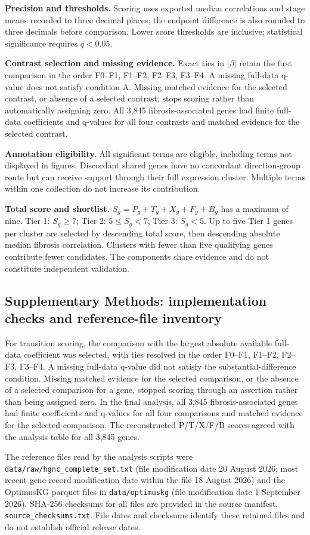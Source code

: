 \documentclass[11pt,a4paper]{article}
\begin{document}
\small
\textbf{Precision and thresholds.} Scoring uses exported median correlations and stage means recorded to three decimal places; the endpoint difference is also rounded to three decimals before comparison. Lower score thresholds are inclusive; statistical significance requires $q<0.05$.

\textbf{Contrast selection and missing evidence.} Exact ties in $|\beta|$ retain the first comparison in the order F0--F1, F1--F2, F2--F3, F3--F4. A missing full-data q-value does not satisfy condition A. Missing matched evidence for the selected contrast, or absence of a selected contrast, stops scoring rather than automatically assigning zero. All 3,845 fibrosis-associated genes had finite full-data coefficients and q-values for all four contrasts and matched evidence for the selected contrast.

\textbf{Annotation eligibility.} All significant terms are eligible, including terms not displayed in figures. Discordant shared genes have no concordant direction-group route but can receive support through their full expression cluster. Multiple terms within one collection do not increase its contribution.

\textbf{Total score and shortlist.} $S_g=P_g+T_g+X_g+F_g+B_g$ has a maximum of nine. Tier 1: $S_g\geq7$; Tier 2: $5\leq S_g<7$; Tier 3: $S_g<5$. Up to five Tier 1 genes per cluster are selected by descending total score, then descending absolute median fibrosis correlation. Clusters with fewer than five qualifying genes contribute fewer candidates. The components share evidence and do not constitute independent validation.
\endgroup

\subsection*{Supplementary Methods: implementation checks and reference-file inventory}
For transition scoring, the comparison with the largest absolute available full-data coefficient was selected, with ties resolved in the order F0--F1, F1--F2, F2--F3, F3--F4. A missing full-data q-value did not satisfy the substantial-difference condition. Missing matched evidence for the selected comparison, or the absence of a selected comparison for a gene, stopped scoring through an assertion rather than being assigned zero. In the final analysis, all 3,845 fibrosis-associated genes had finite coefficients and q-values for all four comparisons and matched evidence for the selected comparison. The reconstructed P/T/X/F/B scores agreed with the analysis table for all 3,845 genes.

The reference files read by the analysis scripts were \nolinkurl{data/raw/hgnc_complete_set.txt} (file modification date 20 August 2026; most recent gene-record modification date within the file 18 August 2026) and the OptimusKG parquet files in \nolinkurl{data/optimuskg} (file modification date 1 September 2026). SHA-256 checksums for all files are provided in the source manifest, \nolinkurl{source_checksums.txt}. File dates and checksums identify these retained files and do not establish official release dates.
\end{document}
